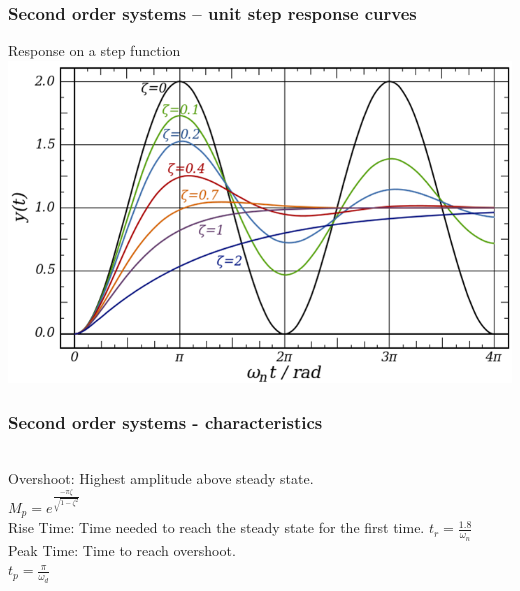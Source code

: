 \begin{frame}
\frametitle{Second order systems – unit step response curves}
 Response on a step function
\\ \vspace{1cm} \includegraphics[width=0.8\linewidth]{Afbeelding6}
\end{frame}

\begin{frame}
\frametitle{Second order systems - characteristics}
\\ Overshoot: Highest amplitude above steady state.
\\ $M_p = e^{\frac{-\pi\zeta}{\sqrt{1-\zeta^2}}}$
\vspace{0.12cm}
\pause
\\ Rise Time: Time needed to reach the steady state for the first time. $t_r = \frac{1.8}{\omega_n}$
\vspace{0.12cm}
\pause
\\ Peak Time: Time to reach overshoot.\\$t_p =\frac{\pi}{\omega_d}$
\\ \begin{figure}
\end{figure}
\end{frame}

